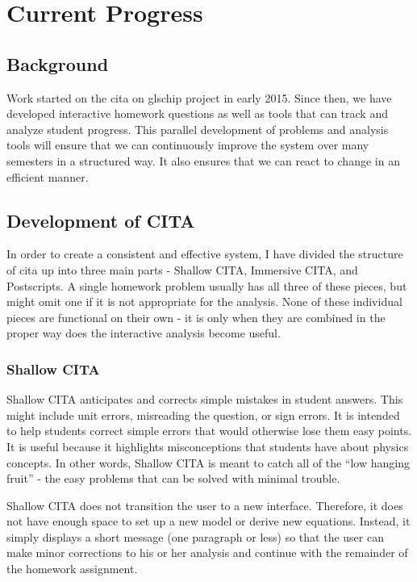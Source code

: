 \chapter[Chapter 4: Current Progress]{Current Progress}

\section{Background}

Work started on the \gls{cita} on gls{chip} project in early 2015. Since then, we have developed interactive homework questions as well as tools that can track and analyze student progress. This parallel development of problems and analysis tools will ensure that we can continuously improve the system over many semesters in a structured way. It also ensures that we can react to change in an efficient manner.

\section{Development of CITA}

In order to create a consistent and effective system, I have divided the structure of \gls{cita} up into three main parts - Shallow CITA, Immersive CITA, and Postscripts. A single homework problem usually has all three of these pieces, but might omit one if it is not appropriate for the analysis. None of these individual pieces are functional on their own - it is only when they are combined in the proper way does the interactive analysis become useful.

\subsection{Shallow CITA}

Shallow CITA anticipates and corrects simple mistakes in student answers. This might include unit errors, misreading the question, or sign errors. It is intended to help students correct simple errors that would otherwise lose them easy points. It is useful because it highlights misconceptions that students have about physics concepts. In other words, Shallow CITA is meant to catch all of the ``low hanging fruit'' - the easy problems that can be solved with minimal trouble.

Shallow CITA does not transition the user to a new interface. Therefore, it does not have enough space to set up a new model or derive new equations. Instead, it simply displays a short message (one paragraph or less) so that the user can make minor corrections to his or her analysis and continue with the remainder of the homework assignment.

